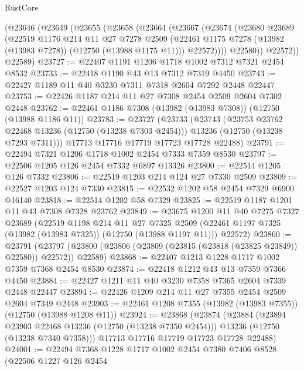 \begin{lexlean}{RustCore}
\begin{coremodule}
    (@23646
      (@23649
        (@23655
          (@23658
            (@23664
              (@23667
                (@23674
                  (@23680
                    @23689
                    (@22519
                      @1176
                      @214
                      @11
                      @27
                      @7278
                      @2509
                      (@22461 @1175 @7278 (@13982 (@13983 @7278)) (@12750 (@13988 @1175 @11)))
                      @22572))))
              @22580))
          @22572))
      @22589)
@23727 := @22407 @1191 @1206 @1718 @1002 @7312 @7321 @2454 @8532
@23733 := @22418 @1190 @43 @13 @7312 @7319 @4450
@23743 := @22427 @1189 @11 @40 @3230 @7311 @7318 @2604 @7292 @2448 @22447
@23753 := @22426 @1187 @214 @11 @27 @7308 @2454 @2509 @2604 @7302 @2448
@23762 := @22461 @1186 @7308 (@13982 (@13983 @7308)) (@12750 (@13988 @1186 @11))
@23783 := @23727
    (@23733
      (@23743
        (@23753 @23762 @22468 @13236 (@12750 (@13238 @7303 @2454)))
        @13236
        (@12750 (@13238 @7293 @7311)))
      @17713
      @17716
      @17719
      @17723
      @17728
      @22488)
@23791 := @22494 @7321 @1206 @1718 @1002 @2454 @7333 @7359 @8530
@23797 := @22506 @1205 @126 @2454 @7332 @6897 @13326
@23800 := @22514 @1205 @126 @7332
@23806 := @22519 @1203 @214 @124 @27 @7330 @2509
@23809 := @22527 @1203 @124 @7330
@23815 := @22532 @1202 @58 @2454 @7329 @6900 @16140
@23818 := @22514 @1202 @58 @7329
@23825 := @22519 @1187 @1201 @11 @43 @7308 @7328 @23762
@23849 := @23675
    @1200
    @11
    @40
    @7275
    @7327
    @23689
    (@22519
      @1198
      @214
      @11
      @27
      @7325
      @2509
      (@22461 @1197 @7325 (@13982 (@13983 @7325)) (@12750 (@13988 @1197 @11)))
      @22572)
@23860 := @23791
    (@23797 (@23800 (@23806 (@23809 (@23815 (@23818 (@23825 @23849)) @22580)) @22572)) @22589)
@23868 := @22407 @1213 @1228 @1717 @1002 @7359 @7368 @2454 @8530
@23874 := @22418 @1212 @43 @13 @7359 @7366 @4450
@23884 := @22427 @1211 @11 @40 @3230 @7358 @7365 @2604 @7339 @2448 @22447
@23894 := @22426 @1209 @214 @11 @27 @7355 @2454 @2509 @2604 @7349 @2448
@23903 := @22461 @1208 @7355 (@13982 (@13983 @7355)) (@12750 (@13988 @1208 @11))
@23924 := @23868
    (@23874
      (@23884
        (@23894 @23903 @22468 @13236 (@12750 (@13238 @7350 @2454)))
        @13236
        (@12750 (@13238 @7340 @7358)))
      @17713
      @17716
      @17719
      @17723
      @17728
      @22488)
@24001 := @22494
    @7368
    @1228
    @1717
    @1002
    @2454
    @7380
    @7406
    @8528
    (@22506
      @1227
      @126
      @2454

\end{coremodule}
\end{lexlean}
